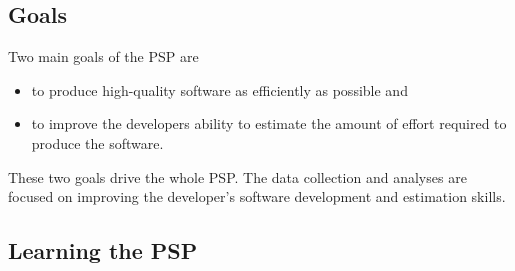 \subsection{Goals}
Two main goals of the PSP are \begin{itemize}
\item{to produce high-quality software as efficiently as possible and}
\item{to improve the developers ability to estimate the amount of effort required 
to produce the software.}
\end{itemize}
These two goals drive the whole PSP. The data collection and analyses are
focused on improving the developer's software development and estimation
skills. 

\subsection{Learning the PSP}

